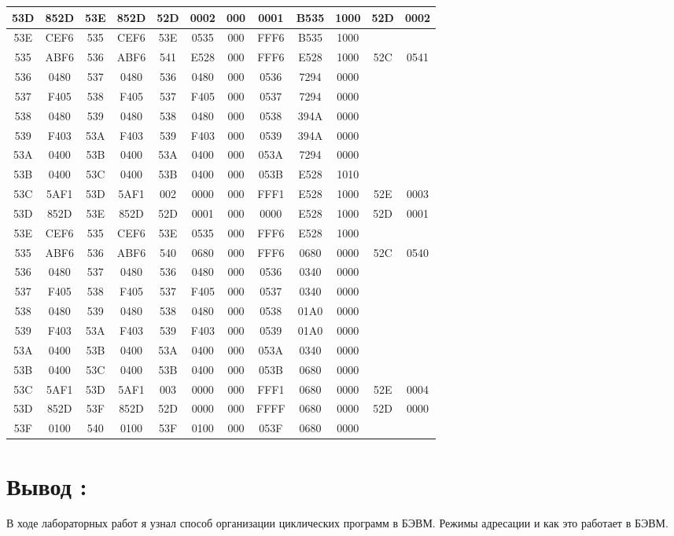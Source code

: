 \begin{center}
\begin{tabular}{|c|c|c|c|c|c|c|c|c|c|c|c|}
        \hline
        53D	& 852D	& 53E	& 852D	& 52D	& 0002	& 000	& 0001	& B535	& 1000	& 52D	& 0002 \\
        \hline
        53E	& CEF6	& 535	& CEF6	& 53E	& 0535	& 000	& FFF6	& B535	& 1000 & & \\
        \hline
        535	& ABF6	& 536	& ABF6	& 541	& E528	& 000	& FFF6	& E528	& 1000	& 52C	& 0541 \\
        \hline
        536	& 0480	& 537	& 0480	& 536	& 0480	& 000	& 0536	& 7294	& 0000 & & \\
        \hline
        537	& F405	& 538	& F405	& 537	& F405	& 000	& 0537	& 7294	& 0000 & & \\
        \hline
        538	& 0480	& 539	& 0480	& 538	& 0480	& 000	& 0538	& 394A	& 0000 & & \\
        \hline
        539	& F403	& 53A	& F403	& 539	& F403	& 000	& 0539	& 394A	& 0000 & & \\
        \hline
        53A	& 0400	& 53B	& 0400	& 53A	& 0400	& 000	& 053A	& 7294	& 0000 & & \\
        \hline
        53B	& 0400	& 53C	& 0400	& 53B 	& 0400	& 000	& 053B	& E528	& 1010 & & \\
        \hline
        53C	& 5AF1	& 53D	& 5AF1	& 002	& 0000	& 000	& FFF1	& E528	& 1000  & 52E	& 0003 \\
        \hline
        53D	& 852D	& 53E	& 852D	& 52D	& 0001	& 000	& 0000	& E528	& 1000  & 52D	& 0001 \\
        \hline
        53E	& CEF6	& 535	& CEF6	& 53E	& 0535	& 000	& FFF6	& E528	& 1000 & & \\
        \hline
        535	& ABF6	& 536	& ABF6	& 540	& 0680	& 000	& FFF6	& 0680	& 0000	& 52C	& 0540 \\
        \hline
        536	& 0480	& 537	& 0480	& 536	& 0480	& 000	& 0536	& 0340	& 0000 & & \\
        \hline
        537	& F405	& 538	& F405	& 537	& F405	& 000	& 0537	& 0340	& 0000 & & \\
        \hline
        538	& 0480	& 539	& 0480	& 538	& 0480	& 000	& 0538	& 01A0	& 0000 & & \\
        \hline
        539	& F403	& 53A	& F403	& 539	& F403	& 000	& 0539	& 01A0	& 0000 & & \\
        \hline
        53A	& 0400	& 53B	& 0400	& 53A	& 0400	& 000	& 053A	& 0340	& 0000 & & \\
        \hline
        53B	& 0400	& 53C	& 0400	& 53B	& 0400	& 000	& 053B	& 0680	& 0000 & & \\
        \hline
        53C	& 5AF1	& 53D	& 5AF1	& 003	& 0000	& 000	& FFF1	& 0680	& 0000	& 52E	& 0004 \\
        \hline
        53D	& 852D	& 53F	& 852D	& 52D	& 0000	& 000	& FFFF	& 0680	& 0000	& 52D	& 0000 \\
        \hline
        53F	& 0100	& 540	& 0100	& 53F	& 0100	& 000	& 053F	& 0680	& 0000 & & \\
        \hline
	\end{tabular}
\end{center}
\newpage
\thispagestyle{empty}
\section{\textbf{\Large{Вывод :}}}
В ходе лабораторных работ я узнал способ организации циклических программ в БЭВМ. Режимы адресации и как это работает в БЭВМ.